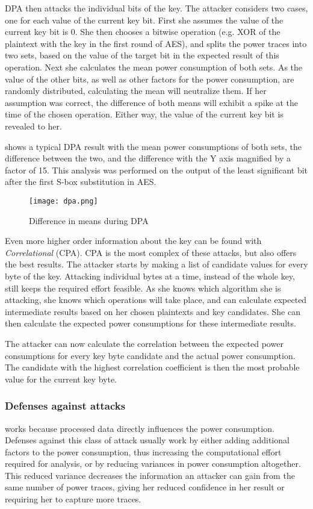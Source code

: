 DPA then attacks the individual bits of the key.
The attacker considers two cases, one for each value of the current key bit.
First she assumes the value of the current key bit is 0.
She then chooses a bitwise operation (e.g. XOR of the plaintext with the key in the first round of AES), and splits the power traces into two sets, based on the value of the target bit in the expected result of this operation.
Next she calculates the mean power consumption of both sets.
As the value of the other bits, as well as other factors for the power consumption, are randomly distributed, calculating the mean will neutralize them.
If her assumption was correct, the difference of both means will exhibit a spike at the time of the chosen operation.
Either way, the value of the current key bit is revealed to her.

 shows a typical DPA result with the mean power consumptions of both sets, the difference between the two, and the difference with the Y axis magnified by a factor of 15.
This analysis was performed on the output of the least significant bit after the first S-box substitution in AES.

\begin{figure}[h]
  \centering
  \texttt{[image: dpa.png]}
  \caption{Difference in means during DPA\cite{kocher2011introduction}}
  \label{fig:dpa}
\end{figure}

Even more higher order information about the key can be found with \emph{Correlational \poweranalysis{}} (CPA).
CPA is the most complex of these attacks, but also offers the best results.
The attacker starts by making a list of candidate values for every byte of the key.
Attacking individual bytes at a time, instead of the whole key, still keeps the required effort feasible.
As she knows which algorithm she is attacking, she knows which operations will take place, and can calculate expected intermediate results based on her chosen plaintexts and key candidates.
She can then calculate the expected power consumptions for these intermediate results.

The attacker can now calculate the correlation between the expected power consumptions for every key byte candidate and the actual power consumption.
The candidate with the highest correlation coefficient is then the most probable value for the current key byte.

\subsubsection{Defenses against \poweranalysis{} attacks}
\Poweranalysis{} works because processed data directly influences the power consumption.
Defenses against this class of attack usually work by either adding additional factors to the power consumption, thus increasing the computational effort required for analysis, or by reducing variances in power consumption altogether.
This reduced variance decreases the information an attacker can gain from the same number of power traces, giving her reduced confidence in her result or requiring her to capture more traces.

